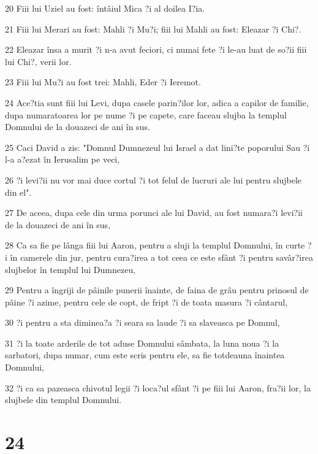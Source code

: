 \par 20 Fiii lui Uziel au fost: întâiul Mica ?i al doilea I?ia.
\par 21 Fiii lui Merari au fost: Mahli ?i Mu?i; fiii lui Mahli au fost: Eleazar ?i Chi?.
\par 22 Eleazar însa a murit ?i n-a avut feciori, ci numai fete ?i le-au luat de so?ii fiii lui Chi?, verii lor.
\par 23 Fiii lui Mu?i au fost trei: Mahli, Eder ?i Ieremot.
\par 24 Ace?tia sunt fiii lui Levi, dupa casele parin?ilor lor, adica a capilor de familie, dupa numaratoarea lor pe nume ?i pe capete, care faceau slujba la templul Domnului de la douazeci de ani în sus.
\par 25 Caci David a zis: "Domnul Dumnezeul lui Israel a dat lini?te poporului Sau ?i l-a a?ezat în Ierusalim pe veci,
\par 26 ?i levi?ii nu vor mai duce cortul ?i tot felul de lucruri ale lui pentru slujbele din el".
\par 27 De aceea, dupa cele din urma porunci ale lui David, au fost numara?i levi?ii de la douazeci de ani în sus,
\par 28 Ca sa fie pe lânga fiii lui Aaron, pentru a sluji la templul Domnului, în curte ?i în camerele din jur, pentru cura?irea a tot ceea ce este sfânt ?i pentru savâr?irea slujbelor în templul lui Dumnezeu,
\par 29 Pentru a îngriji de pâinile punerii înainte, de faina de grâu pentru prinosul de pâine ?i azime, pentru cele de copt, de fript ?i de toata masura ?i cântarul,
\par 30 ?i pentru a sta diminea?a ?i seara sa laude ?i sa slaveasca pe Domnul,
\par 31 ?i la toate arderile de tot aduse Domnului sâmbata, la luna noua ?i la sarbatori, dupa numar, cum este scris pentru ele, sa fie totdeauna înaintea Domnului,
\par 32 ?i ca sa pazeasca chivotul legii ?i loca?ul sfânt ?i pe fiii lui Aaron, fra?ii lor, la slujbele din templul Domnului.

\chapter{24}

